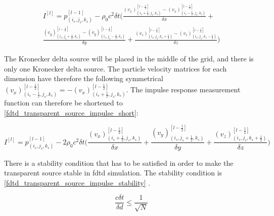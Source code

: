 \begin{multline}\label{fdtd_transparent_source_impulse}
I^{[l]}=p_{(i_{s},j_{s},k_{s})}^{[l-1]} - \rho_0 c^2 \delta t  \Biggl( \frac{(v_x)_{(i_{s}+\frac{1}{2},j_{s},k_{s})}^{[l-\frac{1}{2}]} - (v_x)_{(i_{s}-\frac{1}{2},j_{s},k_{s})}^{[l-\frac{1}{2}]}}{\delta x} +\\
 \frac{(v_y)_{(i_{s},j_{s}+\frac{1}{2},k_{s})}^{[l-\frac{1}{2}]}-(v_y)_{(i_{s},j_{s}-\frac{1}{2},k_{s})}^{[l-\frac{1}{2}]}}{\delta y} +  
 \frac{(v_z)_{(i_{s},j_{s},k_{s}+\frac{1}{2})}^{[l-\frac{1}{2}]}-(v_z)_{(i_{s},j_{s},k_{s}-\frac{1}{2})}^{[l-\frac{1}{2}]}}{\delta z} \Biggr)
\end{multline}


The Kronecker delta source will be placed in the middle of the grid, and there is only one Kronecker delta source. The particle velocity matrices for each dimension have therefore the following symmetrical $(v_x)_{(i_{s}-\frac{1}{2},j_{s},k_{s})}^{[l-\frac{1}{2}]} = -(v_x)_{(i_{s}+\frac{1}{2},j_{s},k_{s})}^{[l-\frac{1}{2}]}$. The impulse response measurement function can therefore be shortened to \autoref{fdtd_transparent_source_impulse_short}:

\begin{equation}\label{fdtd_transparent_source_impulse_short}
I^{[l]}=p_{(i_{s},j_{s},k_{s})}^{[l-1]} - 2\rho_0 c^2 \delta t  \Biggl( \frac{(v_x)_{(i_{s}+\frac{1}{2},j_{s},k_{s})}^{[l-\frac{1}{2}]}}{\delta x} +
 \frac{(v_y)_{(i_{s},j_{s}+\frac{1}{2},k_{s})}^{[l-\frac{1}{2}]}}{\delta y} +  
 \frac{(v_z)_{(i_{s},j_{s},k_{s}+\frac{1}{2})}^{[l-\frac{1}{2}]}}{\delta z} \Biggr)
\end{equation}

There is a stability condition that has to be satisfied in order to make the transparent source  stable in \gls{fdtd} simulation. The stability condition is \autoref{fdtd_transparent_source_impulse_stability} \citep{FDTDtransparent}. 


\begin{equation}\label{fdtd_transparent_source_impulse_stability}
\frac{c \delta t}{\delta d} \leq \frac{1}{\sqrt{N}}
\end{equation}

        \startexplain
    \stopexplain
    
    

